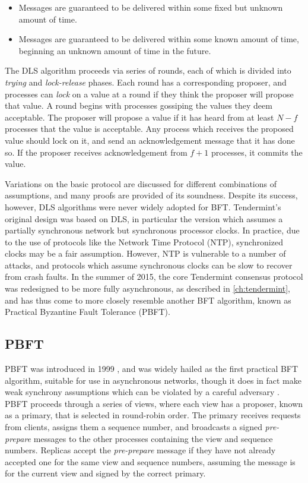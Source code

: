 \begin{itemize}
\item{Messages are guaranteed to be delivered within some fixed but unknown amount of time.}
\item{Messages are guaranteed to be delivered within some known amount of time, beginning an unknown amount of time in the future.}
\end{itemize}

The DLS algorithm proceeds via series of rounds, each of which is divided into \emph{trying} and \emph{lock-release} phases.
Each round has a corresponding proposer, and processes can \emph{lock} on a value at a round if they think
the proposer will propose that value.
A round begins with processes gossiping the values they deem acceptable.
The proposer will propose a value if it has heard from at least $N - f$ processes that the value is acceptable.
Any process which receives the proposed value should lock on it, and send an acknowledgement message
that it has done so.
If the proposer receives acknowledgement from $f+1$ processes, it commits the value.

Variations on the basic protocol are discussed for different combinations of assumptions,
and many proofs are provided of its soundness.
Despite its success, however, DLS algorithms were never widely adopted for BFT.
Tendermint's original design was based on DLS, in particular the version which assumes
a partially synchronous network but synchronous processor clocks.
In practice, due to the use of protocols like the Network Time Protocol (NTP), 
synchronized clocks may be a fair assumption.
However, NTP is vulnerable to a number of attacks,
and protocols which assume synchronous clocks can be slow to recover from crash faults.
In the summer of 2015, the core Tendermint consensus protocol was redesigned to be more fully asynchronous,
as described in \ref{ch:tendermint},
and has thus come to more closely resemble another BFT algorithm,
known as Practical Byzantine Fault Tolerance (PBFT).

\subsection{PBFT}

PBFT was introduced in 1999 \cite{pbft}, and was widely hailed as the first practical BFT algorithm,
suitable for use in asynchronous networks,
though it does in fact make weak synchrony assumptions which can be violated by a careful adversary \cite{honeybadger}.
PBFT proceeds through a series of views, 
where each view has a proposer, known as a primary,
that is selected in round-robin order.
The primary receives requests from clients,
assigns them a sequence number, and broadcasts a signed \emph{pre-prepare}
messages to the other processes containing the view and sequence numbers.
Replicas accept the \emph{pre-prepare} message if they have not already accepted one for the same
view and sequence numbers, assuming the message is for the current view and signed by the correct primary.

